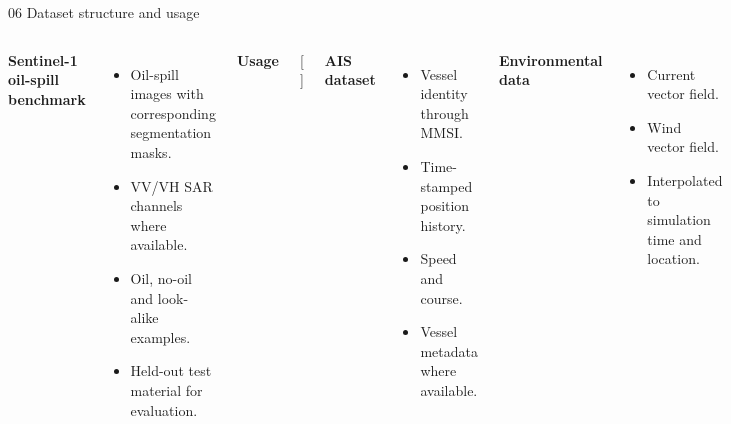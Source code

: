 \documentclass[aspectratio=169,11pt]{beamer}
\begin{document}
\begin{frame}[t]{06 \quad Dataset structure and usage}
\small

\begin{columns}[T,totalwidth=\textwidth]


\textbf{\color{blue}Sentinel-1 oil-spill benchmark}

\begin{itemize}
\item Oil-spill images with corresponding segmentation masks.
\item VV/VH SAR channels where available.
\item Oil, no-oil and look-alike examples.
\item Held-out test material for evaluation.
\end{itemize}

\vspace{0.12cm}

\textbf{Usage}

[
\rightarrow
{}
\rightarrow
{}
]


\textbf{\color{orange}AIS dataset}

\begin{itemize}
\item Vessel identity through MMSI.
\item Time-stamped position history.
\item Speed and course.
\item Vessel metadata where available.
\end{itemize}

\vspace{0.10cm}

\textbf{\color{teal}Environmental data}

\begin{itemize}
\item Current vector field.
\item Wind vector field.
\item Interpolated to simulation time and location.
\end{itemize}

\end{columns}

\end{frame}
\end{document}
